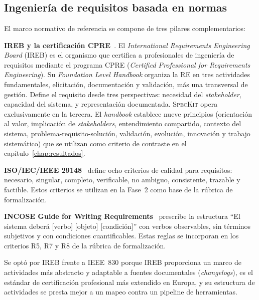 \chapter{\stateoftheartname}
\label{chap:estado-arte}

\section{Ingenier\'ia de requisitos basada en normas}

El marco normativo de referencia se compone de tres pilares complementarios:

\textbf{IREB y la certificaci\'on CPRE}~\cite{cpre,ireb_glossary,ireb_principles}. El \emph{International Requirements Engineering Board} (IREB) es el organismo que certifica a profesionales de ingenier\'ia de requisitos mediante el programa CPRE (\emph{Certified Professional for Requirements Engineering}). Su \emph{Foundation Level Handbook} organiza la RE en tres actividades fundamentales, elicitaci\'on, documentaci\'on y validaci\'on, m\'as una transversal de gesti\'on. Define el requisito desde tres perspectivas: necesidad del \emph{stakeholder}, capacidad del sistema, y representaci\'on documentada. \textsc{SpecKit} opera exclusivamente en la tercera. El \emph{handbook} establece nueve principios (orientaci\'on al valor, implicaci\'on de \emph{stakeholders}, entendimiento compartido, contexto del sistema, problema-requisito-soluci\'on, validaci\'on, evoluci\'on, innovaci\'on y trabajo sistem\'atico) que se utilizan como criterio de contraste en el cap\'itulo~\ref{chap:resultados}.

\textbf{ISO/IEC/IEEE 29148}~\cite{iso29148} define ocho criterios de calidad para requisitos: necesario, singular, completo, verificable, no ambiguo, consistente, trazable y factible. Estos criterios se utilizan en la Fase~2 como base de la r\'ubrica de formalizaci\'on.

\textbf{INCOSE Guide for Writing Requirements}~\cite{incose} prescribe la estructura ``El sistema deber\'a [verbo] [objeto] [condici\'on]'' con verbos observables, sin t\'erminos subjetivos y con condiciones cuantificables. Estas reglas se incorporan en los criterios R5, R7 y R8 de la r\'ubrica de formalizaci\'on.

Se opt\'o por IREB frente a IEEE~830 porque IREB proporciona un marco de actividades m\'as abstracto y adaptable a fuentes documentales (\emph{changelogs}), es el est\'andar de certificaci\'on profesional m\'as extendido en Europa, y su estructura de actividades se presta mejor a un mapeo contra un pipeline de herramientas.

